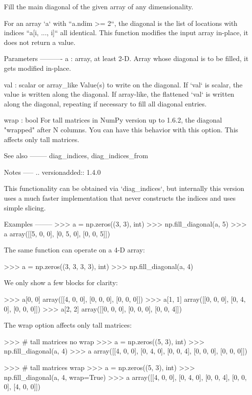 \begin{DoxyVerb}Fill the main diagonal of the given array of any dimensionality.

For an array `a` with ``a.ndim >= 2``, the diagonal is the list of
locations with indices ``a[i, ..., i]`` all identical. This function
modifies the input array in-place, it does not return a value.

Parameters
----------
a : array, at least 2-D.
  Array whose diagonal is to be filled, it gets modified in-place.

val : scalar or array_like
  Value(s) to write on the diagonal. If `val` is scalar, the value is
  written along the diagonal. If array-like, the flattened `val` is
  written along the diagonal, repeating if necessary to fill all
  diagonal entries.

wrap : bool
  For tall matrices in NumPy version up to 1.6.2, the
  diagonal "wrapped" after N columns. You can have this behavior
  with this option. This affects only tall matrices.

See also
--------
diag_indices, diag_indices_from

Notes
-----
.. versionadded:: 1.4.0

This functionality can be obtained via `diag_indices`, but internally
this version uses a much faster implementation that never constructs the
indices and uses simple slicing.

Examples
--------
>>> a = np.zeros((3, 3), int)
>>> np.fill_diagonal(a, 5)
>>> a
array([[5, 0, 0],
       [0, 5, 0],
       [0, 0, 5]])

The same function can operate on a 4-D array:

>>> a = np.zeros((3, 3, 3, 3), int)
>>> np.fill_diagonal(a, 4)

We only show a few blocks for clarity:

>>> a[0, 0]
array([[4, 0, 0],
       [0, 0, 0],
       [0, 0, 0]])
>>> a[1, 1]
array([[0, 0, 0],
       [0, 4, 0],
       [0, 0, 0]])
>>> a[2, 2]
array([[0, 0, 0],
       [0, 0, 0],
       [0, 0, 4]])

The wrap option affects only tall matrices:

>>> # tall matrices no wrap
>>> a = np.zeros((5, 3), int)
>>> np.fill_diagonal(a, 4)
>>> a
array([[4, 0, 0],
       [0, 4, 0],
       [0, 0, 4],
       [0, 0, 0],
       [0, 0, 0]])

>>> # tall matrices wrap
>>> a = np.zeros((5, 3), int)
>>> np.fill_diagonal(a, 4, wrap=True)
>>> a
array([[4, 0, 0],
       [0, 4, 0],
       [0, 0, 4],
       [0, 0, 0],
       [4, 0, 0]])


\end{DoxyVerb}
